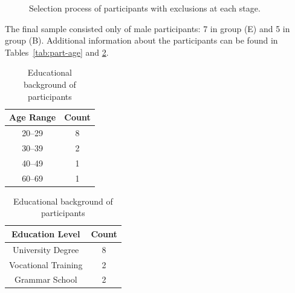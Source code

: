 \begin{figure}[ht]
    \centering
    \caption[Participant selection flowchart]{Selection process of participants with exclusions at each stage.}
    \label{fig:part-flow}
\end{figure}

The final sample consisted only of male participants: 7 in group (E) and 5 in group (B). Additional information about the participants can be found in Tables~\ref{tab:part-age} and \ref{tab:part-edu}.

\begingroup
\tablespacing

\begin{table}[ht]
    \parbox{.45\linewidth}{
        \centering
        \begin{tabular}{c c}
            \toprule
            Age Range & Count \\
            \midrule
            20--29 & 8 \\
            30--39 & 2 \\
            40--49 & 1 \\
            60--69 & 1 \\
            \bottomrule
        \end{tabular}
        \caption{Age distribution of participants}
        \label{tab:part-age}
    }
    \hfill
    \parbox{.45\linewidth}{
        \begin{tabular}{c c}
            \toprule
            Education Level & Count \\
            \midrule
            University Degree & 8 \\
            Vocational Training & 2 \\
            Grammar School & 2 \\
            \bottomrule
        \end{tabular}
        \caption{Educational background of participants}
        \label{tab:part-edu}
    }
\end{table}

